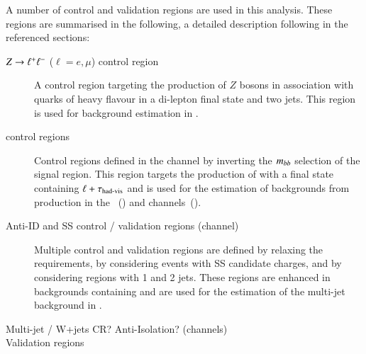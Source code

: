 A number of control and validation regions are used in this
analysis. These regions are summarised in the following, a detailed
description following in the referenced sections:
\begin{description}

\item[$Z \rightarrow \ell^{+}\ell^{-}$ ($\ell = e, \mu$) control region] A
  control region targeting the production of $Z$ bosons in association
  with quarks of heavy flavour in a di-lepton final state and two
  \btagged jets. This region is used for background estimation in
  .

\item[\ttbar control regions] Control regions defined in the \lephad
  channel by inverting the $m_{bb}$ selection of the signal region. This
  region targets the production of \ttbar with a final state
  containing $\ell + \tau_{\text{had-vis}}$ and is used for the estimation of
  \faketauhadvis backgrounds from \ttbar production in the
  \hadhad~() and \lephad
  channels~().

\item[Anti-ID and SS control / validation regions (\hadhad channel)]
  Multiple control and validation regions are defined by relaxing the
  \tauid requirements, by considering events with SS \tauhadvis
  candidate charges, and by considering regions with 1 and 2 \btagged
  jets. These regions are enhanced in backgrounds containing
  \faketauhadvis and are used for the estimation of the multi-jet
  background in .

\item[Multi-jet / W+jets CR? Anti-Isolation? (\lephad channels)]

\item[Validation regions] 

\end{description}


